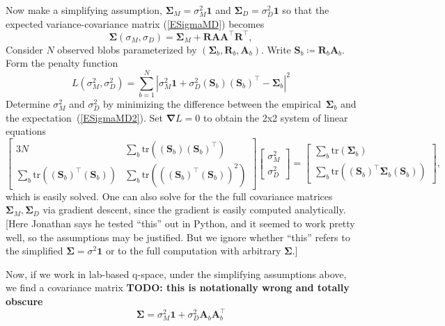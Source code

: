 \documentclass[11pt,a4paper]{article}
\def\v#1{\bm{{#1}}}
\def\tr{^\intercal}
\def\trace{\mathrm{tr}}
\begin{document}
Now make a simplifying assumption,
$\v\Sigma_M = \sigma_M^2 \v1$ and $\v\Sigma_D = \sigma_D^2 \v1$
so that the expected variance-covariance matrix (\ref{ESigmaMD}) becomes
\begin{equation}\label{ESigmaMD2}
  \v\Sigma(\sigma_M,\sigma_D) = \v\Sigma_M + \v{R} \v{A} \v{A}\tr \v{R}\tr,
\end{equation}
Consider $N$ observed blobs parameterized by $(\v\Sigma_b, \v{R}_b, \v{A}_b)$.
Write $\v{S}_b\coloneqq\v{R}_b\v{A}_b$.
Form the penalty function
\begin{equation}
  L(\sigma_M^2, \sigma_D^2)
  = \sum_{b=1}^N
    \left|\sigma_M^2\v1 + \sigma_D^2 (\v{S}_b)(\v{S}_b)\tr - \v\Sigma_b\right|^2
\end{equation}
Determine $\sigma_M^2$ and $\sigma_D^2$ by minimizing the difference
between the empirical~$\v\Sigma_b$ and the expectation~(\ref{ESigmaMD2}).
Set $\v\nabla L = 0$ to obtain the 2x2 system of linear equations
\begin{equation}
  \begin{bmatrix}
    3N & \sum_b \trace( (\v{S}_b)(\v{S}_b)\tr) \\
    \sum_b \trace((\v{S}_b)\tr(\v{S}_b)) & \sum_b \trace(((\v{S}_b)\tr(\v{S}_b))^2)
  \end{bmatrix}
  \begin{bmatrix}
    \sigma_M^2 \\
    \sigma_D^2
  \end{bmatrix}
  =
  \begin{bmatrix}
    \sum_b \trace(\v\Sigma_b) \\
    \sum_b \trace((\v{S}_b)\tr \v\Sigma_b (\v{S}_b))
  \end{bmatrix},
\end{equation}
which is easily solved.
One can also solve for the the full covariance matrices $\v\Sigma_M, \v\Sigma_D$
via gradient descent, since the gradient is easily computed analytically.
[Here Jonathan says he tested ``this'' out in Python, and it seemed to work pretty well,
so the assumptions may be justified.
But we ignore whether ``this'' refers to the simplified $\v\Sigma = \sigma^2 \v1$
or to the full computation with arbitrary $\v\Sigma$.]

Now, if we work in lab-based q-space, under the simplifying assumptions above,
we find a covariance matrix
\textbf{TODO: this is notationally wrong and totally obscure}
\begin{equation} \v\Sigma = \sigma_M^2 \v1 + \sigma_D^2 \v{A}_b \v{A}_b\tr \end{equation}
\end{document}
